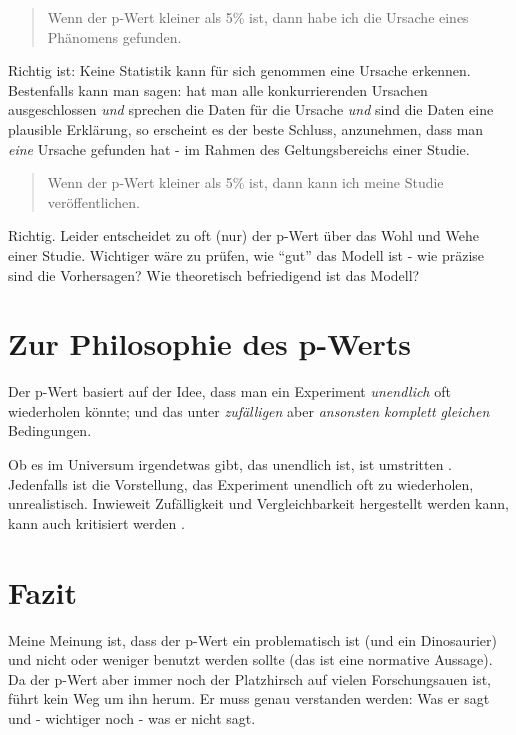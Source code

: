 \documentclass[12pt,ngerman,]{book}
\begin{document}
\begin{quote}
Wenn der p-Wert kleiner als 5\% ist, dann habe ich die Ursache eines
Phänomens gefunden.
\end{quote}

Richtig ist: Keine Statistik kann für sich genommen eine Ursache
erkennen. Bestenfalls kann man sagen: hat man alle konkurrierenden
Ursachen ausgeschlossen \emph{und} sprechen die Daten für die Ursache
\emph{und} sind die Daten eine plausible Erklärung, so erscheint es der
beste Schluss, anzunehmen, dass man \emph{eine} Ursache gefunden hat -
im Rahmen des Geltungsbereichs einer Studie.

\begin{quote}
Wenn der p-Wert kleiner als 5\% ist, dann kann ich meine Studie
veröffentlichen.
\end{quote}

Richtig. Leider entscheidet zu oft (nur) der p-Wert über das Wohl und
Wehe einer Studie. Wichtiger wäre zu prüfen, wie ``gut'' das Modell ist
- wie präzise sind die Vorhersagen? Wie theoretisch befriedigend ist das
Modell?

\section{Zur Philosophie des p-Werts}\label{zur-philosophie-des-p-werts}

Der p-Wert basiert auf der Idee, dass man ein Experiment
\emph{unendlich} oft wiederholen könnte; und das unter \emph{zufälligen}
aber \emph{ansonsten komplett gleichen} Bedingungen.

Ob es im Universum irgendetwas gibt, das unendlich ist, ist umstritten
\citep{ruckerinfinity}. Jedenfalls ist die Vorstellung, das Experiment
unendlich oft zu wiederholen, unrealistisch. Inwieweit Zufälligkeit und
Vergleichbarkeit hergestellt werden kann, kann auch kritisiert werden
\citep{uncertainty}.

\section{Fazit}\label{fazit}

Meine Meinung ist, dass der p-Wert ein problematisch ist (und ein
Dinosaurier) und nicht oder weniger benutzt werden sollte (das ist eine
normative Aussage). Da der p-Wert aber immer noch der Platzhirsch auf
vielen Forschungsauen ist, führt kein Weg um ihn herum. Er muss genau
verstanden werden: Was er sagt und - wichtiger noch - was er nicht sagt.
\end{document}
